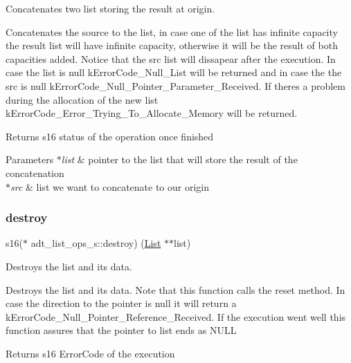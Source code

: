 Concatenates two list storing the result at origin. 

Concatenates the source to the list, in case one of the list has infinite capacity the result list will have infinite capacity, otherwise it will be the result of both capacities added. Notice that the src list will dissapear after the execution. In case the list is null k\+Error\+Code\+\_\+\+Null\+\_\+\+List will be returned and in case the the src is null k\+Error\+Code\+\_\+\+Null\+\_\+\+Pointer\+\_\+\+Parameter\+\_\+\+Received. If there\textquotesingle{}s a problem during the allocation of the new list k\+Error\+Code\+\_\+\+Error\+\_\+\+Trying\+\_\+\+To\+\_\+\+Allocate\+\_\+\+Memory will be returned.

\begin{DoxyReturn}{Returns}
s16 status of the operation once finished 
\end{DoxyReturn}

\begin{DoxyParams}{Parameters}
{\em $\ast$list} & pointer to the list that will store the result of the concatenation \\
\hline
{\em $\ast$src} & list we want to concatenate to our origin \\
\hline
\end{DoxyParams}
\mbox{\label{structadt__list__ops__s_a946d68604826841c974d4a686973934c}} 
\subsubsection{\texorpdfstring{destroy}{destroy}}
{\footnotesize\ttfamily s16($\ast$ adt\+\_\+list\+\_\+ops\+\_\+s\+::destroy) (\hyperlink{structadt__list__s}{List} $\ast$$\ast$list)}



Destroys the list and it\textquotesingle{}s data. 

Destroys the list and its data. Note that this function calls the reset method. In case the direction to the pointer is null it will return a k\+Error\+Code\+\_\+\+Null\+\_\+\+Pointer\+\_\+\+Reference\+\_\+\+Received. If the execution went well this function assures that the pointer to list ends as N\+U\+LL

\begin{DoxyReturn}{Returns}
s16 Error\+Code of the execution 
\end{DoxyReturn}


